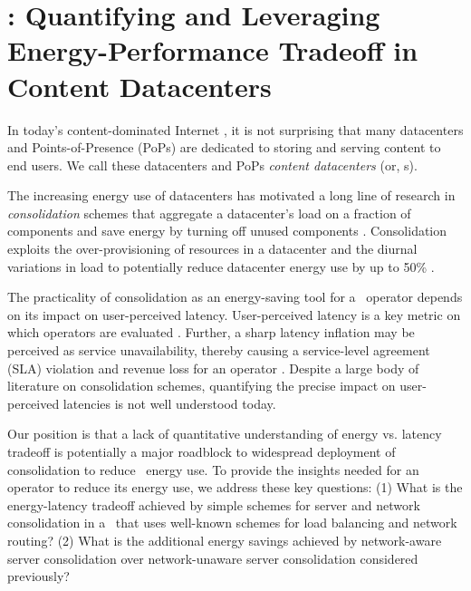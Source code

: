 \chapter{\shrink: Quantifying and Leveraging Energy-Performance Tradeoff in Content Datacenters}
\label{ch:shrink}

In today's content-dominated Internet \cite{cisco-videogrowth, nielsen-video-growth}, it is not surprising that many datacenters and Points-of-Presence (PoPs) are dedicated to storing and serving content to end users. We call these datacenters and PoPs {\em content datacenters} (or, \cdc s).


The increasing energy use of datacenters \cite{GreenbergCost, rasmussen2011determining, power-cost} has motivated a long line of research in \emph{consolidation} schemes that aggregate a datacenter's load on a fraction of components and save energy by turning off unused components \cite{chase2001managing, mathew12, rajamani2003evaluating, lin12}.
Consolidation exploits the over-provisioning of resources in a datacenter and the diurnal variations in load to potentially reduce datacenter energy use by up to 50\% \cite{mathew12}.


The practicality of consolidation as an energy-saving tool for a \cdc\ operator depends on its impact on user-perceived latency. User-perceived latency is a key metric on which  operators are evaluated \cite{comparingCDN}. Further, a sharp latency inflation may be perceived as service unavailability, thereby causing a service-level agreement (SLA) violation and revenue loss for an operator \cite{amazonSLA, microsoftSLA, hpSLA}. Despite a large body of literature on consolidation schemes, quantifying the precise impact on user-perceived latencies is not well understood today.

Our position is that a lack of quantitative understanding of energy vs. latency tradeoff is potentially a major roadblock to widespread deployment of consolidation to reduce \cdc\ energy use. To provide the insights needed for an operator to reduce its energy use, we address these key questions: (1) What is the energy-latency tradeoff achieved by simple schemes for server and network consolidation in a \cdc\ that uses well-known schemes for load balancing and network routing? (2) What is the additional energy savings achieved by network-aware server consolidation over network-unaware server consolidation considered previously?

